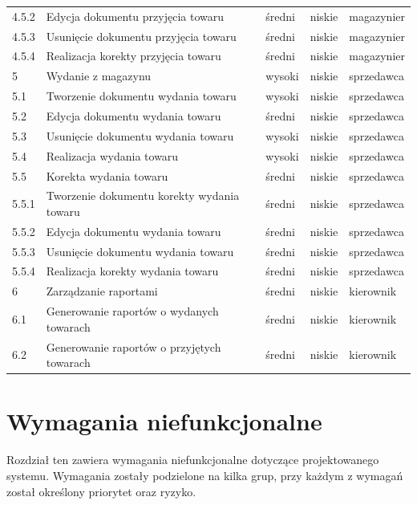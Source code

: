 \begin{table}[ht]
\begin{center}
\begin{tabular}{| l | l | l | l | l |}
            4.5.2 & Edycja dokumentu przyjęcia towaru & średni & niskie & magazynier \\
            4.5.3 & Usunięcie dokumentu przyjęcia towaru & średni & niskie & magazynier \\
            4.5.4 & Realizacja korekty przyjęcia towaru & średni & niskie & magazynier \\ 
            \hline
		   	5 & Wydanie z magazynu & wysoki & niskie & sprzedawca \\
		   	5.1 & Tworzenie dokumentu wydania towaru & wysoki & niskie & sprzedawca \\
		   	5.2 & Edycja dokumentu wydania towaru & średni & niskie & sprzedawca \\
		   	5.3 & Usunięcie dokumentu wydania towaru & wysoki & niskie & sprzedawca \\
		   	5.4 & Realizacja wydania towaru & wysoki & niskie & sprzedawca \\
		   	5.5 & Korekta wydania towaru & średni & niskie & sprzedawca \\
            5.5.1 & Tworzenie dokumentu korekty wydania towaru & średni & niskie & sprzedawca \\
            5.5.2 & Edycja dokumentu wydania towaru & średni & niskie & sprzedawca \\
            5.5.3 & Usunięcie dokumentu wydania towaru & średni & niskie & sprzedawca \\
            5.5.4 & Realizacja korekty wydania towaru & średni & niskie & sprzedawca \\ 
		   	\hline
		   	6 & Zarządzanie raportami & średni & niskie & kierownik \\
		   	6.1 & Generowanie raportów o wydanych towarach & średni & niskie & kierownik \\
		   	6.2 & Generowanie raportów o przyjętych towarach & średni & niskie & kierownik \\
		   	\hline
	    \end{tabular}
	\end{center}
\end{table}
\FloatBarrier

\section{Wymagania niefunkcjonalne}

Rozdział ten zawiera wymagania niefunkcjonalne dotyczące projektowanego systemu.
Wymagania zostały podzielone na kilka grup, przy każdym z wymagań został
określony priorytet oraz ryzyko.

